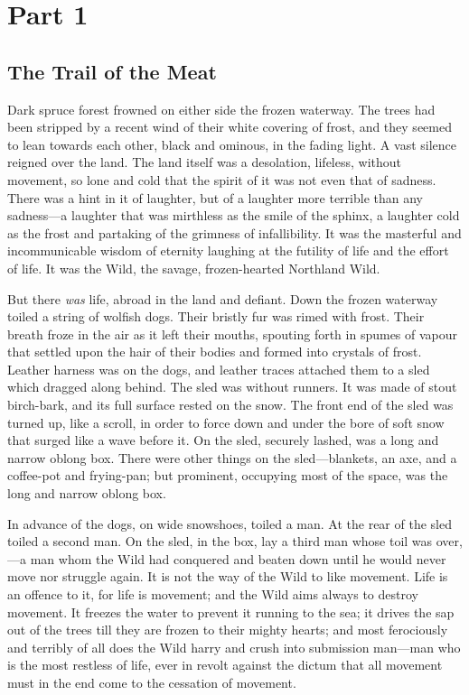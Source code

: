 \chapter{Part 1}
\section{The Trail of the Meat}
Dark spruce forest frowned on either side the frozen waterway. The
trees had been stripped by a recent wind of their white covering of
frost, and they seemed to lean towards each other, black and ominous,
in the fading light. A vast silence reigned over the land. The land
itself was a desolation, lifeless, without movement, so lone and cold
that the spirit of it was not even that of sadness. There was a hint in
it of laughter, but of a laughter more terrible than any sadness—a
laughter that was mirthless as the smile of the sphinx, a laughter cold
as the frost and partaking of the grimness of infallibility. It was the
masterful and incommunicable wisdom of eternity laughing at the
futility of life and the effort of life. It was the Wild, the savage,
frozen-hearted Northland Wild.

But there \textit{was} life, abroad in the land and defiant. Down the frozen
waterway toiled a string of wolfish dogs. Their bristly fur was rimed
with frost. Their breath froze in the air as it left their mouths,
spouting forth in spumes of vapour that settled upon the hair of their
bodies and formed into crystals of frost. Leather harness was on the
dogs, and leather traces attached them to a sled which dragged along
behind. The sled was without runners. It was made of stout birch-bark,
and its full surface rested on the snow. The front end of the sled was
turned up, like a scroll, in order to force down and under the bore of
soft snow that surged like a wave before it. On the sled, securely
lashed, was a long and narrow oblong box. There were other things on
the sled—blankets, an axe, and a coffee-pot and frying-pan; but
prominent, occupying most of the space, was the long and narrow oblong
box.

In advance of the dogs, on wide snowshoes, toiled a man. At the rear of
the sled toiled a second man. On the sled, in the box, lay a third man
whose toil was over,—a man whom the Wild had conquered and beaten down
until he would never move nor struggle again. It is not the way of the
Wild to like movement. Life is an offence to it, for life is movement;
and the Wild aims always to destroy movement. It freezes the water to
prevent it running to the sea; it drives the sap out of the trees till
they are frozen to their mighty hearts; and most ferociously and
terribly of all does the Wild harry and crush into submission man—man
who is the most restless of life, ever in revolt against the dictum
that all movement must in the end come to the cessation of movement.


